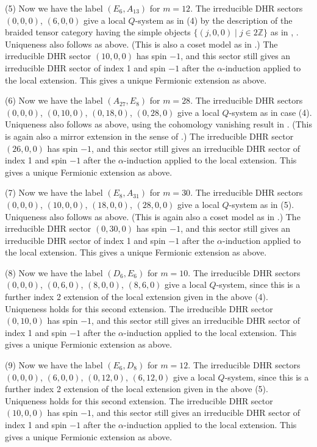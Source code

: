 \documentclass[11pt]{article}
\def\a{\alpha}
\def\Z{{\mathbb Z}}
\begin{document}
(5) Now we have the label $(E_6, A_{13})$ for $m=12$.
The irreducible DHR sectors  $(0,0,0)$, $(6,0,0)$ give a local
$Q$-system as in (4) by the description of the braided tensor
category having the simple objects $\{(j,0,0)\mid j\in2\Z\}$
as in \cite[Section 4.3]{X1}, \cite[Proposition 2.3.1]{X5}.
Uniqueness also follows as above.
(This is also a coset model as in \cite{KL1}.)
The irreducible DHR sector $(10,0,0)$
has spin $-1$, and this sector still gives an irreducible DHR sector
of index 1 and spin $-1$ after the $\a$-induction applied to
the local extension.  This gives a unique Fermionic extension
as above.

(6) Now we have the label $(A_{27}, E_8)$ for $m=28$.
The irreducible DHR sectors  $(0,0,0)$, $(0,10,0)$, $(0,18,0)$,
$(0,28,0)$ give a local
$Q$-system as in case (4).  Uniqueness also follows as above,
using the cohomology vanishing result in \cite{KL2}.
(This is again also a mirror extension in the sense of \cite{X6}.)
The irreducible DHR sector $(26,0,0)$
has spin $-1$, and this sector still gives an irreducible DHR sector
of index 1 and spin $-1$ after the $\a$-induction applied to
the local extension.  This gives a unique Fermionic extension
as above.

(7) Now we have the label $(E_8, A_{31})$ for $m=30$.
The irreducible DHR sectors  $(0,0,0)$, $(10,0,0)$, $(18,0,0)$,
$(28,0,0)$ give a local
$Q$-system as in (5).  Uniqueness also follows as above.
(This is again also a coset model as in \cite{KL1}.)
The irreducible DHR sector $(0,30,0)$
has spin $-1$, and this sector still gives an irreducible DHR sector
of index 1 and spin $-1$ after the $\a$-induction applied to
the local extension.  This gives a unique Fermionic extension
as above.

(8) Now we have the label $(D_6, E_6)$ for $m=10$.
The irreducible DHR sectors  $(0,0,0)$, $(0,6,0)$,
$(8,0,0)$, $(8,6,0)$ give a local
$Q$-system, since this is a further index 2 extension of the
local extension given in the above (4).
Uniqueness holds for this second extension.
The irreducible DHR sector $(0,10,0)$
has spin $-1$, and this sector still gives an irreducible DHR sector
of index 1 and spin $-1$ after the $\a$-induction applied to
the local extension.  This gives a unique Fermionic extension
as above.

(9) Now we have the label $(E_6, D_8)$ for $m=12$.
The irreducible DHR sectors  $(0,0,0)$, $(6,0,0)$,
$(0,12,0)$, $(6,12,0)$ give a local
$Q$-system, since this is a further index 2 extension of the
local extension given in the above (5).
Uniqueness holds for this second extension.
The irreducible DHR sector $(10,0,0)$
has spin $-1$, and this sector still gives an irreducible DHR sector
of index 1 and spin $-1$ after the $\a$-induction applied to
the local extension.  This gives a unique Fermionic extension
as above.
\end{document}
